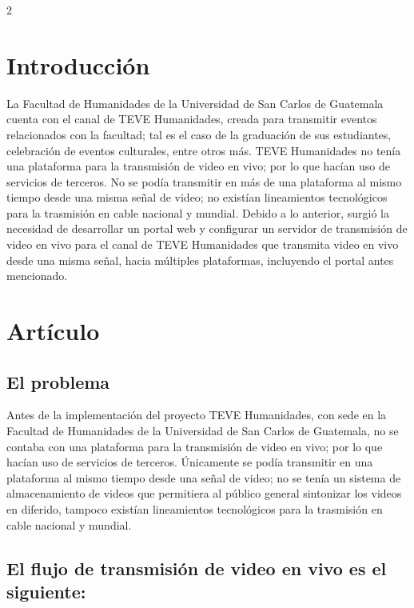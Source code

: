 \documentclass[12pt,spanish,Letterpaper,openany]{book}
\newcommand{\spacethreemilis}{\vspace{3mm}}
\begin{document}
\begin {multicols}{2}

\hypertarget{introduccion-2}{%
\section{Introducción}\label{introduccion-2}}

La Facultad de Humanidades de la Universidad de San Carlos de Guatemala cuenta con el canal de TEVE Humanidades, creada para transmitir eventos relacionados con la facultad; tal es el caso de la graduación de sus estudiantes, celebración de eventos culturales, entre otros más. TEVE Humanidades no tenía una plataforma para la transmisión de video en vivo; por lo que hacían uso de servicios de terceros. No se podía transmitir en más de una plataforma al mismo tiempo desde una misma señal de video; no existían lineamientos tecnológicos para la trasmisión en cable nacional y mundial. Debido a lo anterior, surgió la necesidad de desarrollar un portal web y configurar un servidor de transmisión de video en vivo para el canal de TEVE Humanidades que transmita video en vivo desde una misma señal, hacia múltiples plataformas, incluyendo el portal antes mencionado.

\hypertarget{articulo-1}{%
\section{Artículo}\label{articulo-1}}

\hypertarget{el-problema}{%
\subsection{El problema}\label{el-problema}}

Antes de la implementación del proyecto TEVE Humanidades, con sede en la Facultad de Humanidades de la Universidad de San Carlos de Guatemala, no se contaba con una plataforma para la transmisión de video en vivo; por lo que hacían uso de servicios de terceros. Únicamente se podía transmitir en una plataforma al mismo tiempo desde una señal de video; no se tenía un sistema de almacenamiento de videos que permitiera al público general sintonizar los videos en diferido, tampoco existían lineamientos tecnológicos para la trasmisión en cable nacional y mundial.

\spacethreemilis

\hypertarget{el-flujo-de-transmision-de-video-en-vivo-es-el-siguiente}{%
\subsection{El flujo de transmisión de video en vivo es el siguiente:}\label{el-flujo-de-transmision-de-video-en-vivo-es-el-siguiente}}


\end{multicols}
\end{document}
